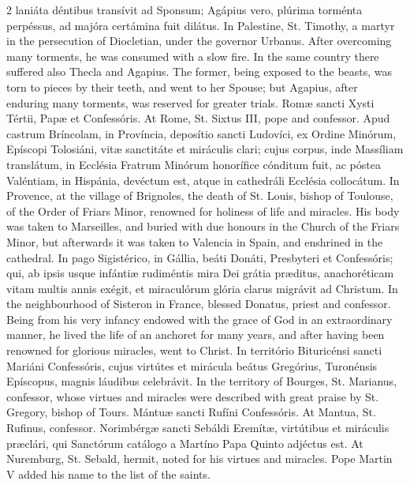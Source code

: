 \begin{paracol}{2}
 laniáta déntibus transívit ad Sponsum; Agápius vero, plúrima torménta 
 perpéssus, ad majóra certámina fuit dilátus.
\switchcolumn
{}
In Palestine, St. Timothy, a martyr 
 in the persecution of Diocletian, under the governor Urbanus. After 
 overcoming many torments, he was consumed with a slow fire. In the 
 same country there suffered also Thecla and Agapius. The former, being 
 exposed to the beasts, was torn to pieces by their teeth, and went to her 
 Spouse; but Agapius, after enduring many torments, was reserved for greater 
 trials.
\switchcolumn*
{}
Romæ sancti Xysti 
 Tértii, Papæ et Confessóris.
\switchcolumn
{}
At Rome, St. Sixtus III, pope and 
 confessor.
\switchcolumn*
{}
Apud castrum Bríncolam, 
 in Província, deposítio sancti Ludovíci, ex Ordine Minórum, Epíscopi 
 Tolosiáni, vitæ sanctitáte et miráculis clari; cujus corpus, inde Massíliam 
 translátum, in Ecclésia Fratrum Minórum honorífice cónditum fuit, ac póstea 
 Valéntiam, in Hispánia, devéctum est, atque in cathedráli Ecclésia 
 collocátum.
\switchcolumn
{}
In Provence, at the village of 
 Brignoles, the death of St. Louis, bishop of Toulouse, of the Order of 
 Friars Minor, renowned for holiness of life and miracles. His body was 
 taken to Marseilles, and buried with due honours in the Church of the Friars 
 Minor, but afterwards it was taken to Valencia in Spain, and enshrined in 
 the cathedral.
\switchcolumn*
{}
In pago Sigistérico, in 
 Gállia, beáti Donáti, Presbyteri et Confessóris; qui, ab ipsis usque 
 infántiæ rudiméntis mira Dei grátia præditus, anachoréticam vitam multis 
 annis exégit, et miraculórum glória clarus migrávit ad Christum.
\switchcolumn
{}
In the neighbourhood of Sisteron in 
 France, blessed Donatus, priest and confessor. Being from his very 
 infancy endowed with the grace of God in an extraordinary manner, he lived 
 the life of an anchoret for many years, and after having been renowned for 
 glorious miracles, went to Christ.
\switchcolumn*
{}
In território 
 Bituricénsi sancti Mariáni Confessóris, cujus virtútes et mirácula beátus 
 Gregórius, Turonénsis Epíscopus, magnis láudibus celebrávit.
\switchcolumn
{}
In the territory of Bourges, St. 
 Marianus, confessor, whose virtues and miracles were described with great 
 praise by St. Gregory, bishop of Tours.
\switchcolumn*
{}
Mántuæ sancti Rufíni 
 Confessóris.
\switchcolumn
{}
At Mantua, St. Rufinus, confessor.
\switchcolumn*
{}
Norimbérgæ sancti 
 Sebáldi Eremítæ, virtútibus et miráculis præclári, qui Sanctórum catálogo a 
 Martíno Papa Quinto adjéctus est.
\switchcolumn
{}
At Nuremburg, St. Sebald, hermit, 
 noted for his virtues and miracles. Pope Martin V added his name to 
 the list of the saints.
\switchcolumn*
{}
\end{paracol}


